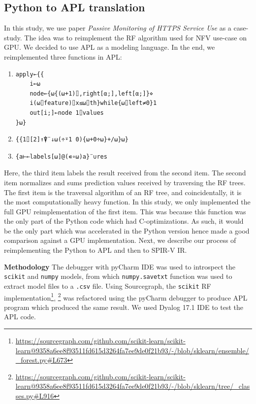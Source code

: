\documentclass{IEEEtran}
\begin{document}
\subsection{Python to APL translation}
\label{ch:p2a}

In this study, we use paper \textit{Passive Monitoring of HTTPS Service Use} \cite{brissaud2019transparent} as a case-study. The idea was to reimplement the \gls{RF} algorithm used for \gls{NFV} use-case on \gls{GPU}. We decided to use APL as a modeling language. In the end, we reimplemented three functions in APL:

\begin{enumerate}
    \item {\aplfont\begin{verbatim}
apply←{{
    i←⍵
    node←{⍵{(⍵+1)⌷,right[⍺;],left[⍺;]}⋄
    i(⍵⌷feature)⌷x≤⍵⌷th}while{⍵⌷left≠0}1
    out[i;]←node 1⌷values
}⍵}
\end{verbatim}}
    \item {\aplfont\begin{verbatim}
{{1⌷[2]↑⍒¨↓⍵(÷⍤1 0){⍵+0÷⍵}+/⍵}⍵}
\end{verbatim}}
    \item {\aplfont\begin{verbatim}
{a⊢←labels[⍵]@(∊∘⍵)a}¨∪res
\end{verbatim}}
\end{enumerate}

Here, the third item labels the result received from the second item. The second item normalizes and sums prediction values received by traversing the RF trees. The first item is the traversal algorithm of an RF tree, and coincidentally, it is the most computationally heavy function. In this study, we only implemented the full GPU reimplementation of the first item. This was because this function was the only part of the Python code which had C-optimizations. As such, it would be the only part which was accelerated in the Python version hence made a good comparison against a GPU implementation. Next, we describe our process of reimplementing the Python to APL and then to SPIR-V IR.

\textbf{Methodology} The debugger with pyCharm IDE was used to introspect the \verb|scikit| and \verb|numpy| models, from which \verb|numpy.savetxt| function was used to extract model files to a \verb|.csv| file. Using Sourcegraph, the \verb|scikit| \gls{RF} implementation\footnote{\url{https://sourcegraph.com/github.com/scikit-learn/scikit-learn@9358a6ee8f93511fd615d3264fa7ee9de0f21b93/-/blob/sklearn/ensemble/_forest.py#L673}}, \footnote{\url{https://sourcegraph.com/github.com/scikit-learn/scikit-learn@9358a6ee8f93511fd615d3264fa7ee9de0f21b93/-/blob/sklearn/tree/_classes.py#L916}} was refactored using the pyCharm debugger to produce APL program which produced the same result. We used Dyalog 17.1 IDE to test the APL code.
\end{document}
